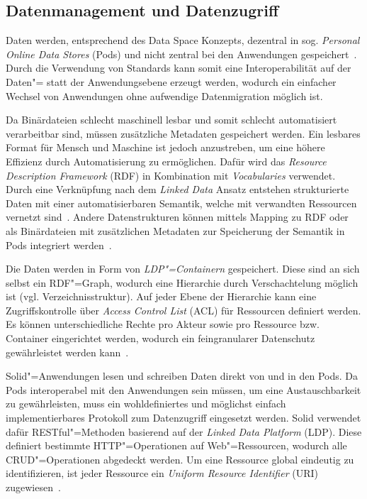 \subsection{Datenmanagement und Datenzugriff}

Daten werden, entsprechend des Data Space Konzepts, dezentral in sog. \emph{Personal Online Data Stores} (Pods) und nicht zentral bei den Anwendungen gespeichert~\cite{mecklerWebLinkedData2023}.
Durch die Verwendung von Standards kann somit eine Interoperabilität auf der Daten"= statt der Anwendungsebene erzeugt werden, wodurch ein einfacher Wechsel von Anwendungen ohne aufwendige Datenmigration möglich ist.

Da Binärdateien schlecht maschinell lesbar und somit schlecht automatisiert verarbeitbar sind, müssen zusätzliche Metadaten gespeichert werden.
Ein lesbares Format für Mensch und Maschine ist jedoch anzustreben, um eine höhere Effizienz durch Automatisierung zu ermöglichen.
Dafür wird das \emph{Resource Description Framework} (RDF) in Kombination mit \emph{Vocabularies} verwendet.
Durch eine Verknüpfung nach dem \emph{Linked Data} Ansatz entstehen strukturierte Daten mit einer automatisierbaren Semantik, welche mit verwandten Ressourcen vernetzt sind~\cite{bizerLinkedDataStory2009,mecklerWebLinkedData2023,sambraSolidPlatformDecentralized2016}.
Andere Datenstrukturen können mittels Mapping zu RDF oder als Binärdateien mit zusätzlichen Metadaten zur Speicherung der Semantik in Pods integriert werden~\cite{mecklerWebLinkedData2023,sambraSolidPlatformDecentralized2016}.

Die Daten werden in Form von \emph{LDP"=Containern} gespeichert.
Diese sind an sich selbst ein RDF"=Graph, wodurch eine Hierarchie durch Verschachtelung möglich ist (vgl. Verzeichnisstruktur).
Auf jeder Ebene der Hierarchie kann eine Zugriffskontrolle über \emph{Access Control List} (ACL) für Ressourcen definiert werden.
Es können unterschiedliche Rechte pro Akteur sowie pro Ressource bzw. Container eingerichtet werden, wodurch ein feingranularer Datenschutz gewährleistet werden kann~\cite{mecklerWebLinkedData2023,sambraSolidPlatformDecentralized2016}.

Solid"=Anwendungen lesen und schreiben Daten direkt von und in den Pods.
Da Pods interoperabel mit den Anwendungen sein müssen, um eine Austauschbarkeit zu gewährleisten, muss ein wohldefiniertes und möglichst einfach implementierbares Protokoll zum Datenzugriff eingesetzt werden.
Solid verwendet dafür RESTful"=Methoden basierend auf der \emph{Linked Data Platform} (LDP).
Diese definiert bestimmte HTTP"=Operationen auf Web"=Ressourcen, wodurch alle CRUD"=Operationen abgedeckt werden.
Um eine Ressource global eindeutig zu identifizieren, ist jeder Ressource ein \emph{Uniform Resource Identifier} (URI) zugewiesen~\cite{mecklerWebLinkedData2023,sambraSolidPlatformDecentralized2016}.

